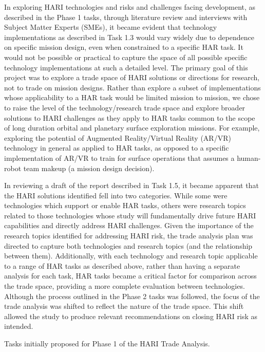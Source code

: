 In exploring HARI technologies and risks and challenges facing development, as described in the Phase 1 tasks, through literature review and interviews with Subject Matter Experts (SMEs), it became evident that technology implementations as described in Task 1.3 would vary widely due to dependence on specific mission design, even when constrained to a specific HAR task.
It would not be possible or practical to capture the space of all possible specific technology implementations at such a detailed level.
The primary goal of this project was to explore a trade space of HARI solutions or directions for research, not to trade on mission designs.
Rather than explore a subset of implementations whose applicability to a HAR task would be limited mission to mission, we chose to raise the level of the technology/research trade space and explore broader solutions to HARI challenges as they apply to HAR tasks common to the scope of long duration orbital and planetary surface exploration missions.
For example, exploring the potential of Augmented Reality/Virtual Reality (AR/VR) technology in general as applied to HAR tasks, as opposed to a specific implementation of AR/VR to train for surface operations that assumes a human-robot team makeup (a mission design decision).

In reviewing a draft of the report described in Task 1.5, it became apparent that the HARI solutions identified fell into two categories.
While some were technologies which support or enable HAR tasks, others were research topics related to those technologies whose study will fundamentally drive future HARI capabilities and directly address HARI challenges.
Given the importance of the research topics identified for addressing HARI risk, the trade analysis plan was directed to capture both technologies and research topics (and the relationship between them).
Additionally, with each technology and research topic applicable to a range of HAR tasks as described above, rather than having a separate analysis for each task, HAR tasks became a critical factor for comparison across the trade space, providing a more complete evaluation between technologies.
Although the process outlined in the Phase 2 tasks was followed, the focus of the trade analysis was shifted to reflect the nature of the trade space.
This shift allowed the study to produce relevant recommendations on closing HARI risk as intended.

\begin{table}[tbp]
    \centering
    \caption[Tasks initially proposed for Phase 1 of the HARI Trade Analysis]{Tasks initially proposed for Phase 1 of the HARI Trade Analysis.}
    \label{table:phase1}
\end{table}

